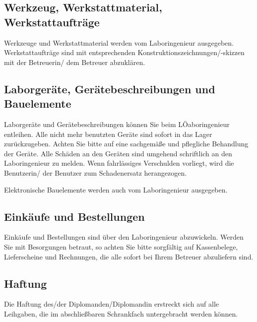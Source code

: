 \subsection{Werkzeug, Werkstattmaterial, Werkstattaufträge}

Werkzeuge und Werkstattmaterial werden vom Laboringenieur ausgegeben. Werkstattaufträge sind mit entsprechenden Konstruktionszeichnungen/-skizzen mit der Betreuerin/ dem Betreuer abzuklären.

\subsection{Laborgeräte, Gerätebeschreibungen und Bauelemente}

Laborgeräte und Gerätebeschreibungen können Sie beim LÖaboringenieur entleihen. 
Alle nicht mehr benutzten Geräte sind sofort in das Lager zurückzugeben. Achten Sie bitte auf eine sachgemäße und pflegliche Behandlung der Geräte. Alle Schäden an den Geräten sind umgehend schriftlich an den Laboringenieur zu melden. Wenn fahrlässiges Verschulden vorliegt, wird die Benutzerin/ der Benutzer zum Schadenersatz herangezogen.

Elektronische Bauelemente werden auch vom Laboringenieur ausgegeben.

\subsection{Einkäufe und Bestellungen}

Einkäufe und Bestellungen sind über den Laboringenieur abzuwickeln. Werden Sie mit Besorgungen betraut, so achten Sie bitte sorgfältig auf Kassenbelege, Lieferscheine und Rechnungen, die alle sofort bei Ihrem Betreuer abzuliefern sind. 

\subsection{Haftung}
Die Haftung des/der Diplomanden/Diplomandin erstreckt sich auf alle Leihgaben, die im abschließbaren Schrankfach untergebracht werden können. 

